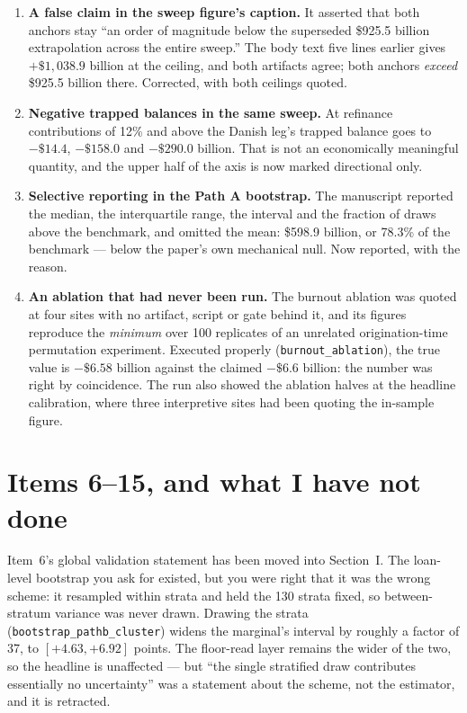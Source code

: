 \documentclass[11pt]{article}
\newcommand{\run}[1]{\texttt{#1}}
\begin{document}
\begin{enumerate}[leftmargin=1.4em]
\item \textbf{A false claim in the sweep figure's caption.} It asserted that both
anchors stay ``an order of magnitude below the superseded \$925.5 billion
extrapolation across the entire sweep.'' The body text five lines earlier gives
$+\$1{,}038.9$ billion at the ceiling, and both artifacts agree; both anchors
\emph{exceed} \$925.5 billion there. Corrected, with both ceilings quoted.

\item \textbf{Negative trapped balances in the same sweep.} At refinance
contributions of 12\% and above the Danish leg's trapped balance goes to
$-\$14.4$, $-\$158.0$ and $-\$290.0$ billion. That is not an economically
meaningful quantity, and the upper half of the axis is now marked directional only.

\item \textbf{Selective reporting in the Path A bootstrap.} The manuscript
reported the median, the interquartile range, the interval and the fraction of
draws above the benchmark, and omitted the mean: \$598.9 billion, or 78.3\% of
the benchmark --- below the paper's own mechanical null. Now reported, with the
reason.

\item \textbf{An ablation that had never been run.} The burnout ablation was
quoted at four sites with no artifact, script or gate behind it, and its figures
reproduce the \emph{minimum} over 100 replicates of an unrelated origination-time
permutation experiment. Executed properly (\run{burnout\_ablation}), the true
value is $-\$6.58$ billion against the claimed $-\$6.6$ billion: the number was
right by coincidence. The run also showed the ablation halves at the headline
calibration, where three interpretive sites had been quoting the in-sample figure.
\end{enumerate}

\section{Items 6--15, and what I have not done}

Item~6's global validation statement has been moved into Section~I. The
loan-level bootstrap you ask for existed, but you were right that it was the
wrong scheme: it resampled within strata and held the 130 strata fixed, so
between-stratum variance was never drawn. Drawing the strata
(\run{bootstrap\_pathb\_cluster}) widens the marginal's interval by roughly a
factor of 37, to $[+4.63, +6.92]$ points. The floor-read layer remains the wider
of the two, so the headline is unaffected --- but ``the single stratified draw
contributes essentially no uncertainty'' was a statement about the scheme, not
the estimator, and it is retracted.
\end{document}
